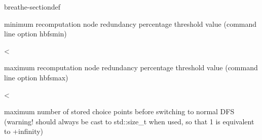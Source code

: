 \documentclass[letterpaper,10pt,openany,oneside,english]{sphinxmanual}
\begin{document}
\begin{fulllineitems}
\begin{sphinxuseclass}{breathe-sectiondef}
\begin{fulllineitems}
\sphinxAtStartPar
minimum recomputation node redundancy percentage threshold value (command line option \sphinxhyphen{}hbfsmin) 

\end{fulllineitems}


\begin{fulllineitems}
\label{\detokenize{ref/ref_cpp:_CPPv4N8ToulBar211hbfsCPLimitE}}\label{\detokenize{ref/ref_cpp:_CPPv3N8ToulBar211hbfsCPLimitE}}\label{\detokenize{ref/ref_cpp:_CPPv2N8ToulBar211hbfsCPLimitE}}\label{\detokenize{ref/ref_cpp:ToulBar2::hbfsCPLimit__ptrdiff_t}}
\pysigstartsignatures
\pysigstartmultiline
{}
\pysigstopmultiline
\pysigstopsignatures
\sphinxAtStartPar
\textless{} 

\sphinxAtStartPar
maximum recomputation node redundancy percentage threshold value (command line option \sphinxhyphen{}hbfsmax) 

\end{fulllineitems}


\begin{fulllineitems}
\label{\detokenize{ref/ref_cpp:_CPPv4N8ToulBar217hbfsOpenNodeLimitE}}\label{\detokenize{ref/ref_cpp:_CPPv3N8ToulBar217hbfsOpenNodeLimitE}}\label{\detokenize{ref/ref_cpp:_CPPv2N8ToulBar217hbfsOpenNodeLimitE}}\label{\detokenize{ref/ref_cpp:ToulBar2::hbfsOpenNodeLimit__ptrdiff_t}}
\pysigstartsignatures
\pysigstartmultiline
{}
\pysigstopmultiline
\pysigstopsignatures
\sphinxAtStartPar
\textless{} 

\sphinxAtStartPar
maximum number of stored choice points before switching to normal DFS (warning! should always be cast to std::size\_t when used, so that \sphinxhyphen{}1 is equivalent to +infinity) 


\end{fulllineitems}
\end{sphinxuseclass}
\end{fulllineitems}
\end{document}
